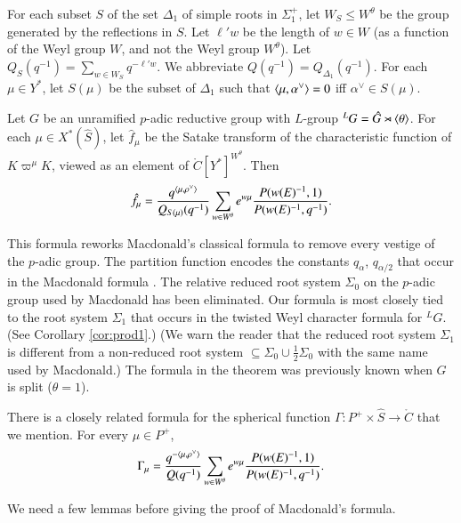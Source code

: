 For each subset $S$
of the set $\Delta_1$ of simple  roots in $\Sigma^+_1$,
 let $W_S\le W^\theta$ be the group generated by the reflections in $S$.
Let $\ell' w$ be the length of $w\in W$ (as a function of the Weyl group $W$, and not the Weyl group $W^\theta$).
Let $Q_S(q^{-1}) = \sum_{w\in W_S} q^{-\ell'w}$.  We abbreviate $Q(q^{-1}) = Q_{\Delta_1}(q^{-1})$.
For each $\mu\in Y^*$, let $S(\mu)$ be the subset of $\Delta_1$ such that $\langle{\mu,\alpha^\vee}\rangle=0$ iff $\alpha^\vee\in S(\mu)$.

\begin{theorem}\label{thm:macdonald}
Let $G$ be an unramified $p$-adic reductive group with $L$-group ${}^LG = \hat G \rtimes \langle{\theta}\rangle$.
For each $\mu\in X^*(\hat S)$, 
let $\hat f_\mu$ be the Satake transform of the characteristic function of $K\varpi^\mu K$, viewed as an element
of $\ring{C}[Y^*]^{W^\theta}$.  Then
\[
\hat f_\mu = \frac{q^{\langle{\mu,\rho^\vee}\rangle}}{ Q_{S(\mu)}(q^{-1})} \sum_{w\in W^\theta} e^{w\mu} \frac{P(w(E)^{-1},1)}{P(w(E)^{-1},q^{-1})}.
\]
\end{theorem}

This formula reworks Macdonald's classical formula  to remove every vestige
of the $p$-adic group.
The partition function
encodes the constants $q_\alpha$, $q_{\alpha/2}$ that occur in the Macdonald formula \cite{macdonaldspherical}.  
The relative reduced root system $\Sigma_0$ on the $p$-adic group used by Macdonald has been eliminated.  
Our formula is most closely
tied to the root system $\Sigma_1$ that occurs in the twisted Weyl character formula for ${}^LG$.  (See Corollary \ref{cor:prod1}.)  
(We warn the reader that the reduced root system $\Sigma_1$
is different from a non-reduced root system $\subseteq \Sigma_0 \cup \frac{1}{2}\Sigma_0$ 
with the same name used by Macdonald.)
The formula in the theorem was previously known when $G$ is split  ($\theta=1$).

There is a closely related formula for the spherical function $\Gamma:P^+\times\hat S\to\ring{C}$ that we mention.
For every $\mu\in P^+$, 
\begin{equation} 
\Gamma_\mu = 
\frac{q^{-\langle{\mu,\rho^\vee}\rangle}}{ Q(q^{-1})} \sum_{w\in W^\theta} e^{w\mu} \frac{P(w(E)^{-1},1)}{P(w(E)^{-1},q^{-1})}.
\end{equation}


We need a few lemmas before giving the proof of Macdonald's
formula.

